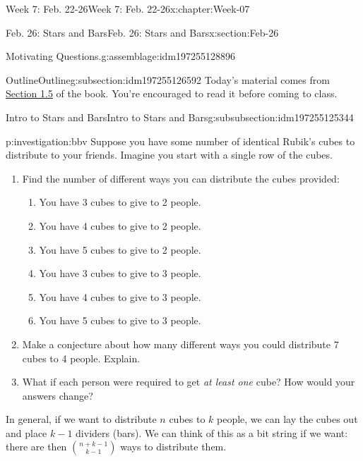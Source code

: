\documentclass[oneside,10pt,]{book}
\numberwithin{equation}{section}
\begin{document}
\begin{chapterptx}{Week 7: Feb. 22-26}{}{Week 7: Feb. 22-26}{}{}{x:chapter:Week-07}
\begin{sectionptx}{Feb. 26: Stars and Bars}{}{Feb. 26: Stars and Bars}{}{}{x:section:Feb-26}
\begin{introduction}{}
\begin{assemblage}{Motivating Questions.}{g:assemblage:idm197255128896}
%
\end{assemblage}
\end{introduction}%
%
%
\typeout{************************************************}
\typeout{************************************************}
%
\begin{subsectionptx}{Outline}{}{Outline}{}{}{g:subsection:idm197255126592}
Today's material comes from \href{http://discrete.openmathbooks.org/dmoi3/sec_stars-and-bars.html}{Section 1.5} of the book. You're encouraged to read it before coming to class.%
%
%
\typeout{************************************************}
\typeout{************************************************}
%
\begin{subsubsectionptx}{Intro to Stars and Bars}{}{Intro to Stars and Bars}{}{}{g:subsubsection:idm197255125344}
\begin{investigation}{}{p:investigation:bbv}%
Suppose you have some number of identical Rubik's cubes to distribute to your friends. Imagine you start with a single row of the cubes.%
\begin{enumerate}
\item{}Find the number of different ways you can distribute the cubes provided:%
\par
%
\begin{enumerate}
\item{}You have 3 cubes to give to 2 people.%
\item{}You have 4 cubes to give to 2 people.%
\item{}You have 5 cubes to give to 2 people.%
\item{}You have 3 cubes to give to 3 people.%
\item{}You have 4 cubes to give to 3 people.%
\item{}You have 5 cubes to give to 3 people.%
\end{enumerate}
%
\item{}Make a conjecture about how many different ways you could distribute 7 cubes to 4 people. Explain.%
\item{}What if each person were required to get \emph{at least one} cube? How would your answers change?%
\end{enumerate}
%
\par\smallskip%
\noindent\hypertarget{g:solution:idm197255109344}{}In general, if we want to distribute \(n\) cubes to \(k\) people, we can lay the cubes out and place \(k-1\) dividers (bars). We can think of this as a bit string if we want: there are then \(\binom{n+k-1}{k-1}\) ways to distribute them.%

\end{investigation}
\end{subsubsectionptx}
\end{subsectionptx}
\end{sectionptx}
\end{chapterptx}
\end{document}

